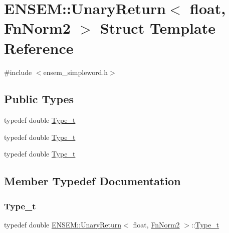\hypertarget{structENSEM_1_1UnaryReturn_3_01float_00_01FnNorm2_01_4}{}\section{E\+N\+S\+EM\+:\+:Unary\+Return$<$ float, Fn\+Norm2 $>$ Struct Template Reference}
\label{structENSEM_1_1UnaryReturn_3_01float_00_01FnNorm2_01_4}


{\ttfamily \#include $<$ensem\+\_\+simpleword.\+h$>$}

\subsection*{Public Types}
\begin{DoxyCompactItemize}
\item 
typedef double \mbox{\hyperlink{structENSEM_1_1UnaryReturn_3_01float_00_01FnNorm2_01_4_a5b5cece226a8a8fa27c401904bc8948d}{Type\+\_\+t}}
\item 
typedef double \mbox{\hyperlink{structENSEM_1_1UnaryReturn_3_01float_00_01FnNorm2_01_4_a5b5cece226a8a8fa27c401904bc8948d}{Type\+\_\+t}}
\item 
typedef double \mbox{\hyperlink{structENSEM_1_1UnaryReturn_3_01float_00_01FnNorm2_01_4_a5b5cece226a8a8fa27c401904bc8948d}{Type\+\_\+t}}
\end{DoxyCompactItemize}


\subsection{Member Typedef Documentation}
\mbox{\label{structENSEM_1_1UnaryReturn_3_01float_00_01FnNorm2_01_4_a5b5cece226a8a8fa27c401904bc8948d}} 
\subsubsection{\texorpdfstring{Type\_t}{Type\_t}\hspace{0.1cm}{\footnotesize\ttfamily [1/3]}}
{\footnotesize\ttfamily typedef double \mbox{\hyperlink{structENSEM_1_1UnaryReturn}{E\+N\+S\+E\+M\+::\+Unary\+Return}}$<$ float, \mbox{\hyperlink{structENSEM_1_1FnNorm2}{Fn\+Norm2}} $>$\+::\mbox{\hyperlink{structENSEM_1_1UnaryReturn_3_01float_00_01FnNorm2_01_4_a5b5cece226a8a8fa27c401904bc8948d}{Type\+\_\+t}}}

